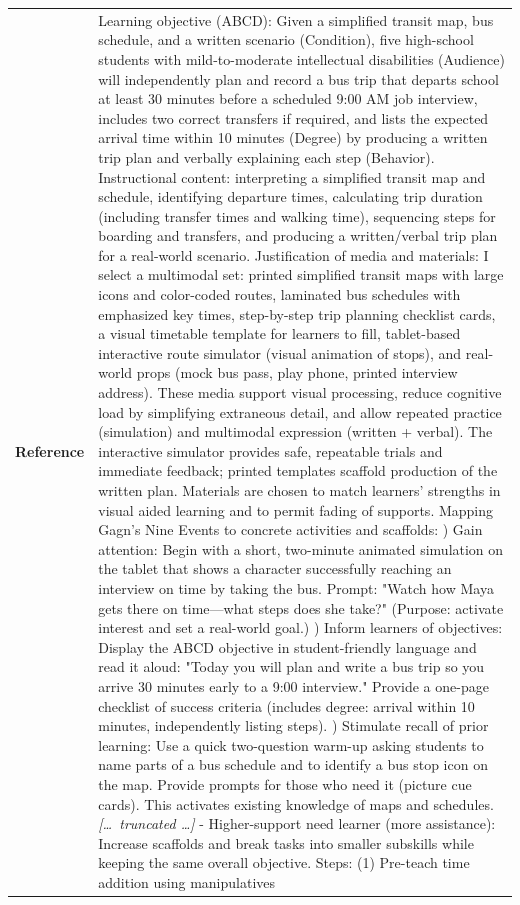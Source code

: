 \begin{longtable}{@{}l p{12.5cm}@{}}
  \textbf{Reference} & Learning objective (ABCD): Given a simplified transit map, bus schedule, and a written scenario (Condition), five high-school students with mild-to-moderate intellectual disabilities (Audience) will independently plan and record a bus trip that departs school at least 30 minutes before a scheduled 9:00 AM job interview, includes two correct transfers if required, and lists the expected arrival time within 10 minutes (Degree) by producing a written trip plan and verbally explaining each step (Behavior). Instructional content: interpreting a simplified transit map and schedule, identifying departure times, calculating trip duration (including transfer times and walking time), sequencing steps for boarding and transfers, and producing a written/verbal trip plan for a real-world scenario. \newline Justification of media and materials: I select a multimodal set: printed simplified transit maps with large icons and color-coded routes, laminated bus schedules with emphasized key times, step-by-step trip planning checklist cards, a visual timetable template for learners to fill, tablet-based interactive route simulator (visual animation of stops), and real-world props (mock bus pass, play phone, printed interview address). These media support visual processing, reduce cognitive load by simplifying extraneous detail, and allow repeated practice (simulation) and multimodal expression (written + verbal). The interactive simulator provides safe, repeatable trials and immediate feedback; printed templates scaffold production of the written plan. Materials are chosen to match learners' strengths in visual aided learning and to permit fading of supports. \newline Mapping Gagn's Nine Events to concrete activities and scaffolds: \newline 1) Gain attention: Begin with a short, two-minute animated simulation on the tablet that shows a character successfully reaching an interview on time by taking the bus. Prompt: "Watch how Maya gets there on time---what steps does she take?" (Purpose: activate interest and set a real-world goal.) \newline 2) Inform learners of objectives: Display the ABCD objective in student-friendly language and read it aloud: "Today you will plan and write a bus trip so you arrive 30 minutes early to a 9:00 interview." Provide a one-page checklist of success criteria (includes degree: arrival within 10 minutes, independently listing steps). \newline 3) Stimulate recall of prior learning: Use a quick two-question warm-up asking students to name parts of a bus schedule and to identify a bus stop icon on the map. Provide prompts for those who need it (picture cue cards). This activates existing knowledge of maps and schedules. \newline \textit{[\ldots\ truncated \ldots]} \newline - Higher-support need learner (more assistance): Increase scaffolds and break tasks into smaller subskills while keeping the same overall objective. Steps: (1) Pre-teach time addition using manipulatives 
\end{longtable}
